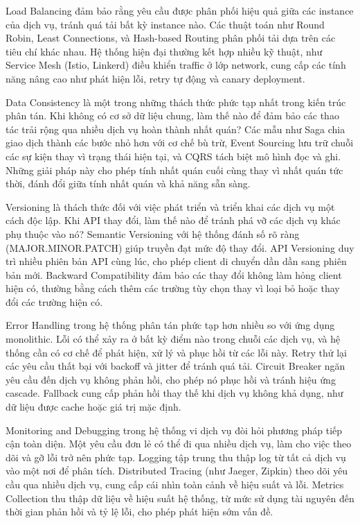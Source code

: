 Load Balancing đảm bảo rằng yêu cầu được phân phối hiệu quả giữa các instance của dịch vụ, tránh quá tải bất kỳ instance nào. Các thuật toán như Round Robin, Least Connections, và Hash-based Routing phân phối tải dựa trên các tiêu chí khác nhau. Hệ thống hiện đại thường kết hợp nhiều kỹ thuật, như Service Mesh (Istio, Linkerd) điều khiển traffic ở lớp network, cung cấp các tính năng nâng cao như phát hiện lỗi, retry tự động và canary deployment.

Data Consistency là một trong những thách thức phức tạp nhất trong kiến trúc phân tán. Khi không có cơ sở dữ liệu chung, làm thế nào để đảm bảo các thao tác trải rộng qua nhiều dịch vụ hoàn thành nhất quán? Các mẫu như Saga chia giao dịch thành các bước nhỏ hơn với cơ chế bù trừ, Event Sourcing lưu trữ chuỗi các sự kiện thay vì trạng thái hiện tại, và CQRS tách biệt mô hình đọc và ghi. Những giải pháp này cho phép tính nhất quán cuối cùng thay vì nhất quán tức thời, đánh đổi giữa tính nhất quán và khả năng sẵn sàng.

Versioning là thách thức đối với việc phát triển và triển khai các dịch vụ một cách độc lập. Khi API thay đổi, làm thế nào để tránh phá vỡ các dịch vụ khác phụ thuộc vào nó? Semantic Versioning với hệ thống đánh số rõ ràng (MAJOR.MINOR.PATCH) giúp truyền đạt mức độ thay đổi. API Versioning duy trì nhiều phiên bản API cùng lúc, cho phép client di chuyển dần dần sang phiên bản mới. Backward Compatibility đảm bảo các thay đổi không làm hỏng client hiện có, thường bằng cách thêm các trường tùy chọn thay vì loại bỏ hoặc thay đổi các trường hiện có.

Error Handling trong hệ thống phân tán phức tạp hơn nhiều so với ứng dụng monolithic. Lỗi có thể xảy ra ở bất kỳ điểm nào trong chuỗi các dịch vụ, và hệ thống cần có cơ chế để phát hiện, xử lý và phục hồi từ các lỗi này. Retry thử lại các yêu cầu thất bại với backoff và jitter để tránh quá tải. Circuit Breaker ngăn yêu cầu đến dịch vụ không phản hồi, cho phép nó phục hồi và tránh hiệu ứng cascade. Fallback cung cấp phản hồi thay thế khi dịch vụ không khả dụng, như dữ liệu được cache hoặc giá trị mặc định.

Monitoring and Debugging trong hệ thống vi dịch vụ đòi hỏi phương pháp tiếp cận toàn diện. Một yêu cầu đơn lẻ có thể đi qua nhiều dịch vụ, làm cho việc theo dõi và gỡ lỗi trở nên phức tạp. Logging tập trung thu thập log từ tất cả dịch vụ vào một nơi để phân tích. Distributed Tracing (như Jaeger, Zipkin) theo dõi yêu cầu qua nhiều dịch vụ, cung cấp cái nhìn toàn cảnh về hiệu suất và lỗi. Metrics Collection thu thập dữ liệu về hiệu suất hệ thống, từ mức sử dụng tài nguyên đến thời gian phản hồi và tỷ lệ lỗi, cho phép phát hiện sớm vấn đề.

